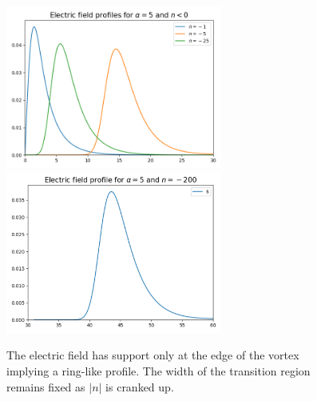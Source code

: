 \begin{figure}[H]
\begin{center}
    \includegraphics[width=2.8in]{Chapter_2_Folder_1912.11321/figures/E_alpha_5_final.png} \includegraphics[width=2.8in]{Chapter_2_Folder_1912.11321/figures/E_alpha_5_n_200.pdf} 
    \caption[\textcolor{red}{This figure shows that the electric field profile for the vortex solutions (in the Abelian Chern-Simons model at finite chemical potential and negative magnetic flux) have a ring-like profile.}]{ {\small The electric field has support only at the edge of the vortex implying a ring-like profile. 
   The width of the transition region remains fixed as $|n|$ is cranked up.} }\label{fig:Eneg}
   \end{center}
\end{figure}

